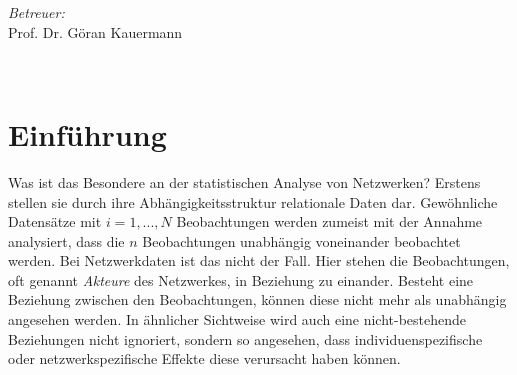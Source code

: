 \documentclass[a4paper,ngerman,oneside,titlepage,bibliography=totoc,11pt]{scrreprt}
\begin{document}
\begin{titlepage}
\begin{minipage}[t]{0.4\textwidth}
\begin{flushright}
\emph{Betreuer:}\\[2mm]
Prof. Dr. Göran Kauermann\\[6mm]
\end{flushright}
\end{minipage}\\[4.5cm]

\end{titlepage}




\begin{abstract}


\begin{center}
{\it \bf Abstract} 
\end{center}
Dieser Bericht behandelt die Analyse der \emph{NISAT database of transfers of small arms, light weapons, and their ammunition, parts and accessories}. Die Netzwerkdaten stellen das internationale Kleinwaffenhandelsnetzwerk im Zeitraum 1992 bis 2011 dar.

Nachdem die Datengrundlage besprochen wird, erfolgt eine deskriptive Analyse des Handelsnetzwerkes anhand Zeitreihen von Netzwerkstatistiken. Im zweiten Teil wird der Querschnitt des Netzwerkes Jahr für Jahr anhand von ERGMs modelliert, um charakteristische Strukturen des Netzwerkes aufzudecken. Der Fokus liegt hierbei auf der Selektion interner Netzwerkstatistiken sowie externer Kovariablen.
 \\
 
 {\bf Schlagwörter}

\end{abstract}




\tableofcontents




\chapter{Einführung}

Was ist das Besondere an der statistischen Analyse von Netzwerken? Erstens stellen sie durch ihre Abhängigkeitsstruktur relationale Daten dar. Gewöhnliche Datensätze mit $i = 1, ..., N$ Beobachtungen werden zumeist mit der Annahme analysiert, dass die $n$ Beobachtungen unabhängig voneinander beobachtet werden. Bei Netzwerkdaten ist das nicht der Fall. Hier stehen die Beobachtungen, oft genannt \emph{Akteure} des Netzwerkes, in Beziehung zu einander. Besteht eine Beziehung zwischen den Beobachtungen, können diese nicht mehr als unabhängig angesehen werden. In ähnlicher Sichtweise wird auch eine nicht-bestehende Beziehungen nicht ignoriert, sondern so angesehen, dass individuenspezifische oder netzwerkspezifische Effekte diese verursacht haben können.
\end{document}
